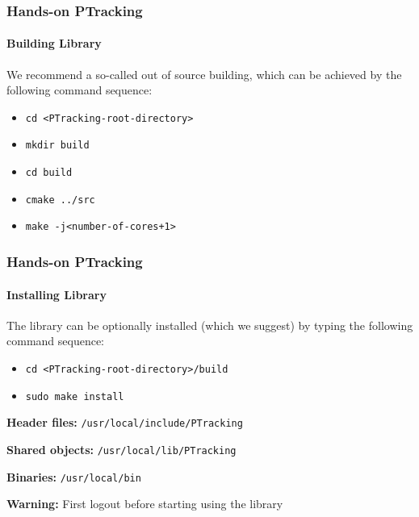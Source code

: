 \begin{frame}
	\frametitle{Hands-on PTracking}
	\framesubtitle{Building Library}
	
	\Large
	
	We recommend a so-called out of source building, which can be achieved by the following command
	sequence:
	
	\vspace{0.2cm}
	
	\begin{itemize}
		\item \texttt{cd <PTracking-root-directory>}
		\item \texttt{mkdir build}
		\item \texttt{cd build}
		\item \texttt{cmake ../src}
		\item \texttt{make -j<number-of-cores+1>}
	\end{itemize}
\end{frame}

\begin{frame}
	\frametitle{Hands-on PTracking}
	\framesubtitle{Installing Library}
	
	\Large
	
	\vspace{0.4cm}
	
	The library can be optionally installed (which we suggest) by typing the following command
	sequence:
	
	\vspace{0.2cm}
	
	\begin{itemize}
		\item \texttt{cd <PTracking-root-directory>/build}
		\item \texttt{sudo make install}
	\end{itemize}
	
	\vspace{0.3cm}
	
	\textbf{Header files:} \texttt{/usr/local/include/PTracking} \\
	
	\vspace{0.1cm}
	
	\textbf{Shared objects:} \texttt{/usr/local/lib/PTracking} \\
	
	\vspace{0.1cm}
	
	\textbf{Binaries:} \texttt{/usr/local/bin} \\
	
	\vspace{0.5cm}
	
	\textbf{Warning:} First logout before starting using the library
\end{frame}

